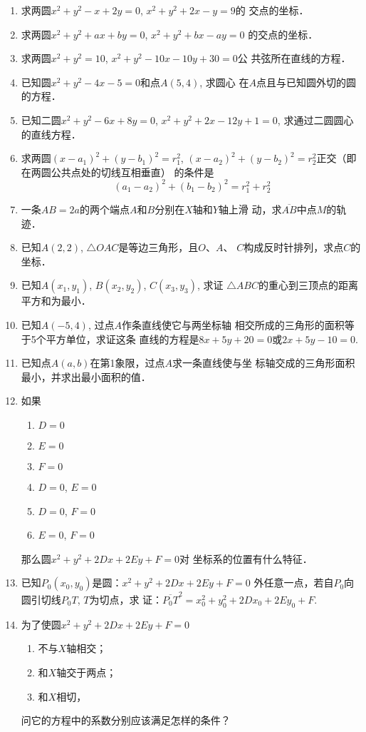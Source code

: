 \begin{enumerate}
\item 求两圆$x^2+y^2-x+2y=0$, $x^2+y^2+2x-y=9$的
交点的坐标．
\item 求两圆$x^2+y^2+ax+by=0$, $x^2+y^2+bx-ay=0$
的交点的坐标．
\item 求两圆$x^2+y^2=10$, $x^2+y^2-10x-10y+30=0$公
共弦所在直线的方程．
\item 已知圆$x^2+y^2-4x-5=0$和点$A(5,4)$, 求圆心
在$A$点且与已知圆外切的圆的方程．
\item 已知二圆$x^2+y^2-6x+8y=0$, $x^2+y^2+2x-12y
+1=0$, 求通过二圆圆心的直线方程．
\item 求两圆$(x-a_1)^2+(y-b_1)^2=r^2_1$, $(x-a_2)^2+(y-
b_2)^2=r^2_2$正交（即在两圆公共点处的切线互相垂直）
的条件是
\[(a_1-a_2)^2+(b_1-b_2)^2=r_1^2+r_2^2\]
\item 一条$AB=2a$的两个端点$A$和$B$分别在$X$轴和$Y$轴上滑
动，求$\overline{AB}$中点$M$的轨迹．
\item 已知$A(2,2)$, $\triangle OAC$是等边三角形，且$O$、$A$、
$C$构成反时针排列，求点$C$的坐标．
\item 已知$A(x_1,y_1)$, $B(x_2,y_2)$, $C(x_3,y_3)$, 求证
$\triangle ABC$的重心到三顶点的距离平方和为最小．
\item 已知$A(-5,4)$, 过点$A$作条直线使它与两坐标轴
相交所成的三角形的面积等于5个平方单位，求证这条
直线的方程是$8x+5y+20=0$或$2x+5y-10=0$.
\item 已知点$A(a,b)$在第1象限，过点$A$求一条直线使与坐
标轴交成的三角形面积最小，并求出最小面积的值．

\item 如果
\begin{multicols}{2}
    \begin{enumerate}
        \item $D=0$
        \item $E=0$
        \item $F=0$
        \item $D=0$, $E=0$
        \item $D=0$, $F=0$
        \item $E=0$, $F=0$
    \end{enumerate}
\end{multicols}
那么圆$x^2+y^2+2Dx+2Ey+F=0$对
坐标系的位置有什么特征．
\item 已知$P_0(x_0,y_0)$是圆：$x^2+y^2+2Dx+2Ey+F=0$
外任意一点，若自$P_0$向圆引切线$P_0T$, $T$为切点，求
证：$\overline{P_0T}^2=x_0^2+y_0^2+2Dx_0+2Ey_0+F$.
\item 为了使圆$x^2+y^2+2Dx+2Ey+F=0$
\begin{enumerate}
\item 不与$X$轴相交；    
\item 和$X$轴交于两点；    
\item 和$X$相切，
\end{enumerate}
问它的方程中的系数分别应该满足怎样的条件？


\end{enumerate}
